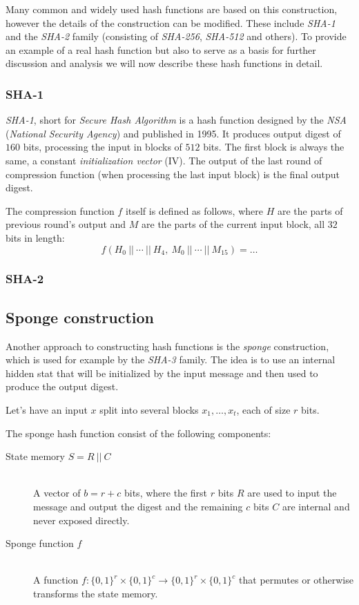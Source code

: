 Many common and widely used hash functions are based on this construction, however the details of the construction can be modified.
These include \emph{SHA-1} and the \emph{SHA-2} family (consisting of \emph{SHA-256}, \emph{SHA-512} and others).
To provide an example of a real hash function but also to serve as a basis for further discussion and analysis we will now describe these hash functions in detail.

\subsubsection{SHA-1}

\emph{SHA-1}, short for \emph{Secure Hash Algorithm} is a hash function designed by the \emph{NSA} (\emph{National Security Agency}) and published in 1995.
It produces output digest of $160$ bits, processing the input in blocks of $512$ bits.
The first block is always the same, a constant \emph{initialization vector} (IV).
The output of the last round of compression function (when processing the last input block) is the final output digest.


The compression function $f$ itself is defined as follows, where $H$ are the parts of previous round's output and $M$ are the parts of
the current input block, all $32$ bits in length:
\[
f(H_0 ~||~ \cdots ~||~ H_4, ~ M_0 ~||~ \cdots ~||~ M_{15}) = \dots
\]

\subsubsection{SHA-2}

\subsection{Sponge construction}
Another approach to constructing hash functions is the \emph{sponge} construction, which is used for example by the \emph{SHA-3} family.
The idea is to use an internal hidden stat that will be initialized by the input message and then used to produce the output digest.

Let's have an input $x$ split into several blocks $x_1, \dots, x_t$, each of size $r$ bits.

The sponge hash function consist of the following components:
\begin{description}
\item[State memory $S = R ~||~ C$] \hfill \\
A vector of $b = r+c$ bits, where the first $r$ bits $R$ are used to input the message and output the digest and the remaining $c$ bits $C$ are internal and never exposed directly.
\item[Sponge function $f$] \hfill \\
A function $f: \{0,1\}^r\times\{0,1\}^c \to \{0,1\}^r\times\{0,1\}^c$ that permutes or otherwise transforms the state memory.
\end{description}

